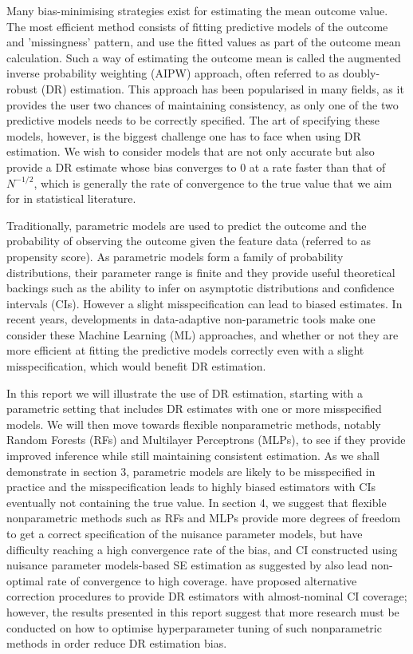 \documentclass[12pt,twoside]{article}
\begin{document}
Many bias-minimising strategies exist for estimating the mean outcome value. The most efficient method consists of fitting predictive models of the outcome and 'missingness' pattern, and use the fitted values as part of the outcome mean calculation. Such a way of estimating the outcome mean is called the augmented inverse probability weighting (AIPW) approach, often referred to as doubly-robust (DR) estimation. This approach has been popularised in many fields, as it provides the user two chances of maintaining consistency, as only one of the two predictive models needs to be correctly specified. The art of specifying these models, however, is the biggest challenge one has to face when using DR estimation. We wish to consider models that are not only accurate but also provide a DR estimate whose bias converges to 0 at a rate faster than that of $N^{-1/2}$, which is generally the rate of convergence to the true value that we aim for in statistical literature.

Traditionally, parametric models are used to predict the outcome and the probability of observing the outcome given the feature data (referred to as propensity score). As parametric models form a family of probability distributions, their parameter range is finite and they provide useful theoretical backings such as the ability to infer on asymptotic distributions and confidence intervals (CIs). However a slight misspecification can lead to biased estimates. In recent years, developments in data-adaptive non-parametric tools make one consider these Machine Learning (ML) approaches, and whether or not they are more efficient at fitting the predictive models correctly even with a slight misspecification, which would benefit DR estimation.
 
In this report we will illustrate the use of DR estimation, starting with a parametric setting that includes DR estimates with one or more misspecified models. We will then move towards flexible nonparametric methods, notably Random Forests (RFs) and Multilayer Perceptrons (MLPs), to see if they provide improved inference while still maintaining consistent estimation. As we shall demonstrate in section 3, parametric models are likely to be misspecified in practice and the misspecification leads to highly biased estimators with CIs eventually not containing the true value. In section 4, we suggest that flexible nonparametric methods such as RFs and MLPs provide more degrees of freedom to get a correct specification of the nuisance parameter models, but have difficulty reaching a high convergence rate of the bias, and CI constructed using nuisance parameter models-based SE estimation as suggested by \cite{davidian} also lead non-optimal rate of convergence to high coverage. \cite{benkeser2017} have proposed alternative correction procedures to provide DR estimators with almost-nominal CI coverage; however, the results presented in this report suggest that more research must be conducted on how to optimise hyperparameter tuning of such nonparametric methods in order reduce DR estimation bias.
\end{document}
